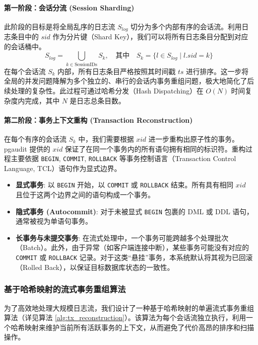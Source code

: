 \paragraph{第一阶段：会话分流 (Session Sharding)}
此阶段的目标是将全局乱序的日志流 $S_{log}$ 切分为多个内部有序的会话流。利用日志条目中的 $sid$ 作为分片键（Shard Key），我们可以将所有日志条目分配到对应的会话桶中。
\begin{equation}
    S_{log} = \bigcup_{k \in \text{SessionIDs}} S_k, \quad \text{其中} \quad S_k = \{ l \in S_{log} \mid l.sid = k \}
\end{equation}
在每个会话流 $S_k$ 内部，所有日志条目严格按照其时间戳 $ts$ 进行排序。这一步将全局的并发问题降解为多个独立的、串行的会话内事务重组问题，极大地简化了后续处理的复杂性。此过程可通过哈希分发（Hash Dispatching）在 $O(N)$ 时间复杂度内完成，其中 $N$ 是日志总条目数。

\paragraph{第二阶段：事务上下文重构 (Transaction Reconstruction)}
在每个有序的会话流 $S_k$ 中，我们需要根据 $xid$ 进一步重构出原子性的事务。pgaudit \cite{pgaudit} 提供的 $xid$ 保证了在同一个事务内的所有语句拥有相同的标识符。重构过程主要依据 \texttt{BEGIN}, \texttt{COMMIT}, \texttt{ROLLBACK} 等事务控制语言（Transaction Control Language, TCL）语句作为显式边界。
\begin{itemize}
    \item \textbf{显式事务}: 以 \texttt{BEGIN} 开始，以 \texttt{COMMIT} 或 \texttt{ROLLBACK} 结束。所有具有相同 $xid$ 且位于这两个边界之间的语句构成一个事务。
    \item \textbf{隐式事务 (Autocommit)}: 对于未被显式 \texttt{BEGIN} 包裹的 DML 或 DDL 语句，通常被视为单语句事务。
    \item \textbf{长事务与未提交事务}: 在流式处理中，一个事务可能跨越多个处理批次（Batch）。此外，由于异常（如客户端连接中断），某些事务可能没有对应的 \texttt{COMMIT} 或 \texttt{ROLLBACK} 记录。对于这类“悬挂”事务，本系统默认将其视为已回滚（Rolled Back），以保证目标数据库状态的一致性。
\end{itemize}

\subsubsection{基于哈希映射的流式事务重组算法}
为了高效地处理大规模日志流，我们设计了一种基于哈希映射的单遍流式事务重组算法（详见算法 \ref{alg:tx_reconstruction}）。该算法为每个会话流独立执行，利用一个哈希映射来维护当前所有活跃事务的上下文，从而避免了代价高昂的排序和扫描操作。

